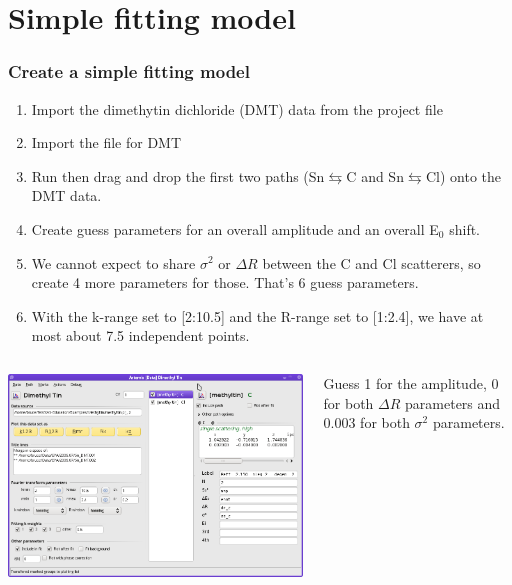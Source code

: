\documentclass[10pt, xcolor=x11names, compress]{beamer}
\begin{document}


\section{Simple fitting model}

\begin{frame}
  \frametitle{Create a simple fitting model}
  \footnotesize%
  \begin{enumerate}
  \item Import the dimethytin dichloride (DMT) data from the {\athena}
    project file
  \item Import the  file for DMT
  \item Run {\feff} then drag and drop the first two paths
    (Sn$\leftrightarrows$C and Sn$\leftrightarrows$Cl) onto the
    DMT data.
  \item Create guess parameters for an overall amplitude and an
    overall E$_0$ shift.
  \item We cannot expect to share $\sigma^2$ or $\Delta R$ 
    between the C and Cl scatterers, so create 4 more parameters for
    those.  That's \alert{6} guess parameters.
  \item With the k-range set to [2:10.5] and the R-range set to
    [1:2.4], we have at most about \alert{7.5} independent points.
  \end{enumerate}
  \begin{columns}
    \begin{column}{0.4\linewidth}
      \includegraphics[width=\linewidth]{images/dmt_start.png}      
    \end{column}
    \begin{column}{0.6\linewidth}
      Guess 1 for the amplitude, 0 for both $\Delta R$ parameters and
      0.003 for both $\sigma^2$ parameters.
    \end{column}
  \end{columns}
\end{frame}
\end{document}

